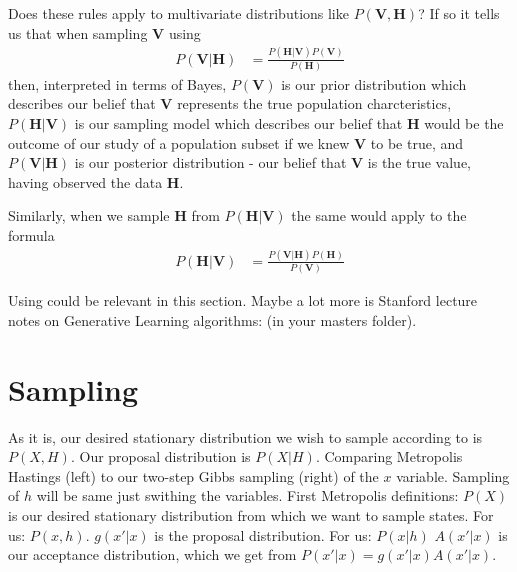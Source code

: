 \documentclass[norsk,a4paper,11pt]{article}
\begin{document}
Does these rules apply to multivariate distributions like $P(\mathbf{V}, \mathbf{H})$?
If so it tells us that when sampling $\mathbf{V}$ using
\begin{align}
	P(\mathbf{V}|\mathbf{H}) &= \frac{P(\mathbf{H}|\mathbf{V})P(\mathbf{V})}{P(\mathbf{H})}
\end{align}
then, interpreted in terms of Bayes, $P(\mathbf{V})$ is our prior distribution which describes our belief that $\mathbf{V}$ represents the true population charcteristics, $P(\mathbf{H}|\mathbf{V})$ is our sampling model which describes our belief that $\mathbf{H}$ would be the outcome of our study of a population subset if we knew $\mathbf{V}$ to be true, and $P(\mathbf{V}|\mathbf{H})$ is our posterior distribution - our belief that $\mathbf{V}$ is the true value, having observed the data $\mathbf{H}$.

Similarly, when we sample $\mathbf{H}$ from $P(\mathbf{H}|\mathbf{V})$ the same would apply to the formula
\begin{align}
	P(\mathbf{H}|\mathbf{V}) &= \frac{P(\mathbf{V}|\mathbf{H})P(\mathbf{H})}{P(\mathbf{V})}
\end{align}



 Using \cite{upennBayes} could be relevant in this section. Maybe a lot more is Stanford lecture notes on Generative Learning algorithms: \cite{genlearnStanford} (in your masters folder).

 \section{Sampling}
 As it is, our desired stationary distribution we wish to sample according to is $P(X, H)$. Our proposal distribution is $P(X|H)$.
Comparing Metropolis Hastings (left) to our two-step Gibbs sampling (right) of the $x$ variable. Sampling of $h$ will be same just swithing the variables. First Metropolis definitions: \linebreak
$P(X)$ is our desired stationary distribution from which we want to sample states. For us: $P(x, h)$. \linebreak
$g(x'|x)$ is the proposal distribution. For us: $P(x|h)$ \linebreak
$A(x'|x)$ is our acceptance distribution, which we get from $P(x'|x) = g(x'|x)A(x'|x)$.
\end{document}
